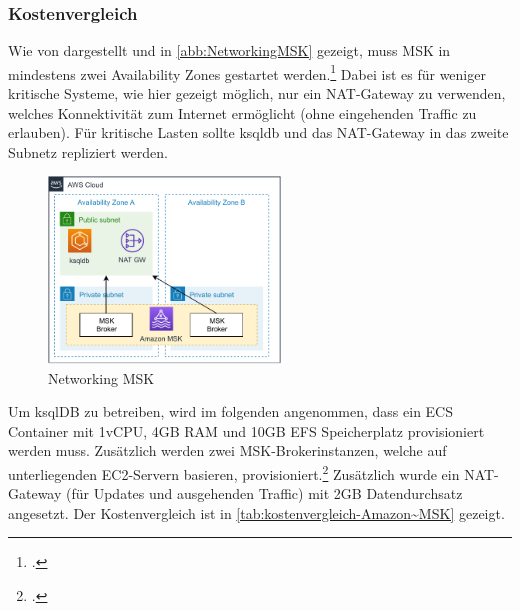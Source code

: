 \subsubsection{Kostenvergleich}
Wie von \citeauthor{Beswick.2020} dargestellt und in \autoref{abb:NetworkingMSK} gezeigt, muss MSK in mindestens zwei Availability Zones gestartet werden.\footcite[Vgl. auch im Folgenden][]{Beswick.2020} Dabei ist es für weniger kritische Systeme, wie hier gezeigt möglich, nur ein \ac{NAT}-Gateway zu verwenden, welches Konnektivität zum Internet ermöglicht (ohne eingehenden Traffic zu erlauben). Für kritische Lasten sollte ksqldb und das \ac{NAT}-Gateway in das zweite Subnetz repliziert werden.
\begin{figure}[H]
\centering
\includegraphics[width=0.55\textwidth]{graphics/MSK-Networking.pdf}
\caption{Networking MSK}
\label{abb:NetworkingMSK}
\end{figure}

Um ksqlDB zu betreiben, wird im folgenden angenommen, dass ein \acf{ECS} Container mit 1vCPU, 4GB \ac{RAM} und 10GB \ac{EFS} Speicherplatz provisioniert werden muss. Zusätzlich werden zwei \ac{MSK}-Brokerinstanzen, welche auf unterliegenden \ac{EC2}-Servern basieren, provisioniert.\footcite[Vgl.][]{AmazonWebServicesInc..o.J.o} Zusätzlich wurde ein \ac{NAT}-Gateway (für Updates und ausgehenden Traffic) mit 2GB Datendurchsatz angesetzt. Der Kostenvergleich ist in \autoref{tab:kostenvergleich-Amazon~MSK} gezeigt.

